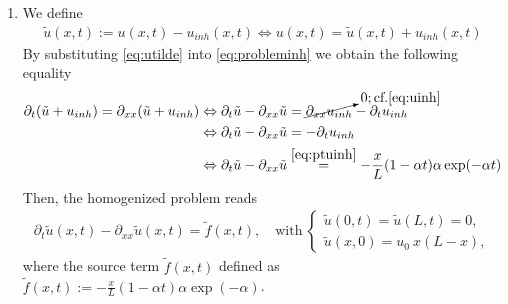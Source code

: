 \documentclass[12pt]{article}
\begin{document}
\begin{enumerate}
	\item We define
	      \begin{align}
		      \label{eq:utilde}
		      \tilde{u}(x,t) := u(x,t) - u_{inh}(x,t) 
		      \Leftrightarrow 
		      u(x,t) = \tilde{u}(x,t) + u_{inh}(x,t)
	      \end{align}
	      By substituting \eqref{eq:utilde} into \eqref{eq:probleminh} we obtain the following equality
	      \begin{align}
		      \partial_t(\tilde{u} + u_{inh}) = \partial_{xx}(\tilde{u} + u_{inh})
		       & \Leftrightarrow
		      \partial_t\tilde{u} - \partial_{xx}\tilde{u}
		      = \cancelto{0; \text{cf.} \eqref{eq:uinh}}{\partial_{xx}u_{inh}} - \partial_{t}u_{inh} \notag \\
		       & \Leftrightarrow
		      \partial_t\tilde{u} - \partial_{xx}\tilde{u}
		      = - \partial_{t}u_{inh}                                                                \notag \\
		       & \Leftrightarrow
		      \partial_t\tilde{u} - \partial_{xx}\tilde{u}
		      \stackrel{\eqref{eq:ptuinh}}{=}
		      - \frac{x}{L}(1-\alpha t)\alpha \exp(-\alpha t)
	      \end{align}
	      Then, the homogenized problem reads
	      \begin{equation}
		      \label{eq:utildeeqn}
		      \boxed{
			      \begin{aligned}
				      \partial_t\tilde{u}(x,t) - \partial_{xx}\tilde{u}(x,t) = \tilde{f}(x,t),
				      \quad \text{with}
				      \
				      \begin{cases}
					      \tilde{u}(0,t)=\tilde{u}(L,t)= 0, \\
					      \tilde{u}(x,0)= u_{0}\ x(L-x),
				      \end{cases}
			      \end{aligned}
		      }
	      \end{equation}
	      where the source term $\tilde{f}(x,t)$ defined as 
	      $\displaystyle \tilde{f}(x,t) := -\frac{x}{L}(1-\alpha t)\alpha \exp(-\alpha)$.
	      

\end{enumerate}
\end{document}
